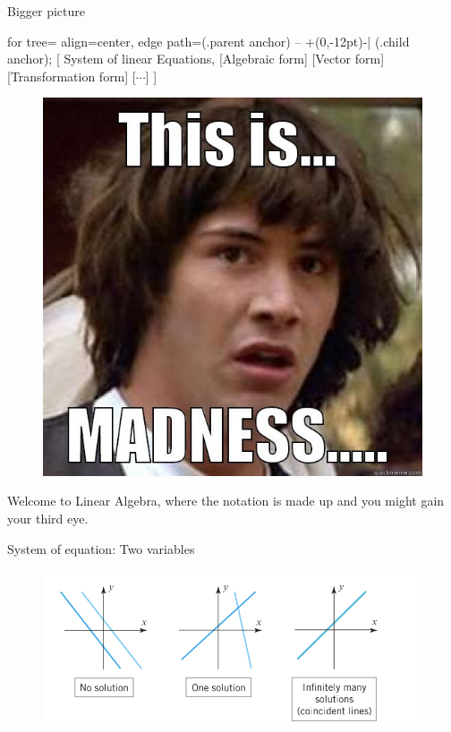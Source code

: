 \documentclass[11pt]{beamer}
\theoremstyle{plain}
\begin{document}
\begin{frame}{Bigger picture}
\begin{center}
	\begin{forest}
		for tree={%
			align=center, %
			edge path={\noexpand{} (.parent anchor) -- +(0,-12pt)-| (.child anchor);}
		}
		[
		System of linear Equations,
		[Algebraic form]
		[Vector form]
		[Transformation form]
        [$\cdots$]
		]
	\end{forest}
\end{center}
\pause
\begin{figure}[H]
\centering
\includegraphics[scale=0.3]{madness.jpeg}
\end{figure}
Welcome to Linear Algebra, where the notation is made up and you might gain your third eye.
\begin{displayquote}
\end{displayquote}
\end{frame}

\begin{frame}{System of equation: Two variables}
\begin{figure}[H]
\centering
\includegraphics[scale=0.5]{L1 lines.png}
\end{figure}
\end{frame}
\end{document}
